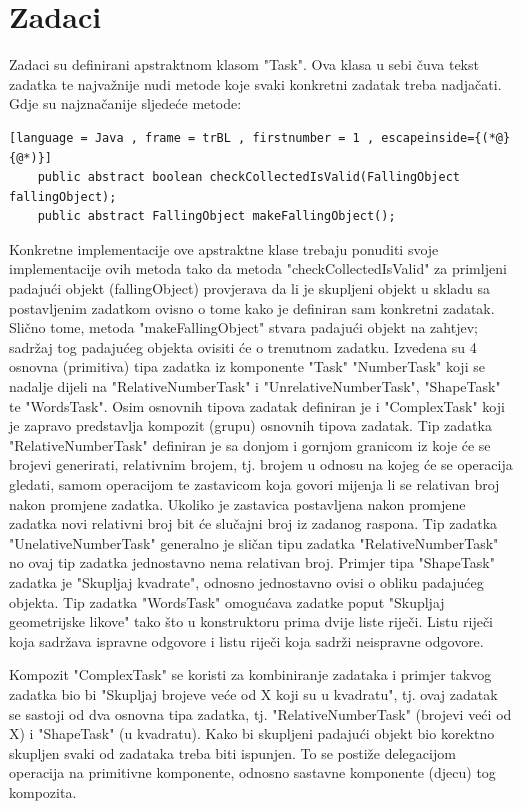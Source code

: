 \documentclass[times, utf8, zavrsni]{fer}
\begin{document}
	\section{Zadaci}
	Zadaci su definirani apstraktnom klasom "Task". Ova klasa u sebi čuva tekst zadatka te najvažnije nudi metode koje svaki konkretni zadatak treba nadjačati. Gdje su najznačanije sljedeće metode:
	\begin{lstlisting}[language = Java , frame = trBL , firstnumber = 1 , escapeinside={(*@}{@*)}]
	public abstract boolean checkCollectedIsValid(FallingObject fallingObject);
	public abstract FallingObject makeFallingObject();
	\end{lstlisting}
	Konkretne implementacije ove apstraktne klase trebaju ponuditi svoje implementacije
	 ovih metoda tako da metoda "checkCollectedIsValid" za primljeni padajući objekt (fallingObject) provjerava da li je skupljeni objekt u skladu sa postavljenim zadatkom ovisno o tome kako je definiran sam konkretni
	 zadatak. Slično tome, metoda "makeFallingObject" stvara padajući objekt na zahtjev;  sadržaj tog padajućeg objekta ovisiti će o trenutnom zadatku. Izvedena su 4 osnovna (primitiva) tipa zadatka iz komponente "Task"
	 "NumberTask" koji se nadalje dijeli na "RelativeNumberTask" i "UnrelativeNumberTask", "ShapeTask" te "WordsTask". Osim osnovnih tipova zadatak definiran je i "ComplexTask"  koji je zapravo predstavlja kompozit (grupu)
	 osnovnih tipova zadatak.
	 Tip zadatka "RelativeNumberTask" definiran je sa donjom i gornjom granicom iz koje će se brojevi generirati, relativnim brojem, tj. brojem u odnosu na kojeg će se operacija gledati, samom operacijom te
	 zastavicom koja govori mijenja li se relativan broj nakon promjene zadatka. Ukoliko je zastavica postavljena nakon promjene zadatka novi relativni broj bit će slučajni broj iz zadanog raspona. Tip zadatka
	 "UnelativeNumberTask" generalno je sličan tipu zadatka "RelativeNumberTask" no ovaj tip zadatka jednostavno nema relativan broj. Primjer tipa "ShapeTask" zadatka je "Skupljaj kvadrate", odnosno jednostavno ovisi
	 o obliku padajućeg objekta. Tip zadatka "WordsTask" omogućava zadatke poput "Skupljaj geometrijske likove" tako što u konstruktoru prima dvije liste riječi. Listu riječi koja sadržava ispravne odgovore i listu riječi
	 koja sadrži neispravne odgovore. 
	 
	 Kompozit "ComplexTask" se koristi za kombiniranje zadataka i primjer takvog zadatka bio bi "Skupljaj brojeve veće od X koji su u kvadratu", tj. ovaj zadatak se sastoji od dva osnovna tipa zadatka, tj.
	 "RelativeNumberTask" (brojevi veći od X) i "ShapeTask" (u kvadratu). Kako bi skupljeni padajući objekt bio korektno skupljen svaki od zadataka treba biti ispunjen. To se postiže delegacijom operacija na primitivne
	 komponente, odnosno sastavne komponente (djecu) tog kompozita.
	
\end{document}
